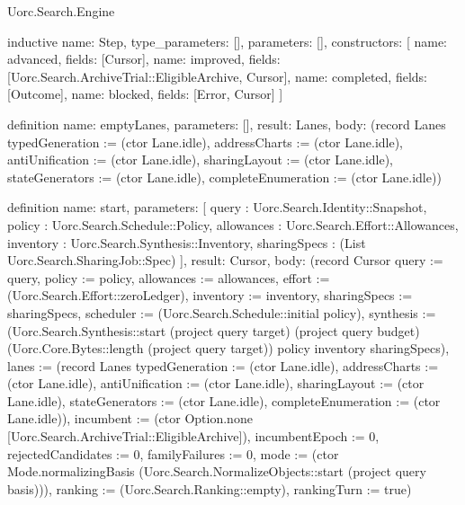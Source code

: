 \begin{lexlean}{Uorc.Search.Engine}
\begin{semanticmodule}
inductive{
  name: Step,
  type_parameters: [],
  parameters: [],
  constructors: [
    {name: advanced, fields: [Cursor]},
    {name: improved, fields: [Uorc.Search.ArchiveTrial::EligibleArchive, Cursor]},
    {name: completed, fields: [Outcome]},
    {name: blocked, fields: [Error, Cursor]}
  ]
}

definition{
  name: emptyLanes,
  parameters: [],
  result: Lanes,
  body: (record Lanes {typedGeneration := (ctor Lane.idle), addressCharts := (ctor Lane.idle), antiUnification := (ctor Lane.idle), sharingLayout := (ctor Lane.idle), stateGenerators := (ctor Lane.idle), completeEnumeration := (ctor Lane.idle)})
}

definition{
  name: start,
  parameters: [
    query : Uorc.Search.Identity::Snapshot,
    policy : Uorc.Search.Schedule::Policy,
    allowances : Uorc.Search.Effort::Allowances,
    inventory : Uorc.Search.Synthesis::Inventory,
    sharingSpecs : (List Uorc.Search.SharingJob::Spec)
  ],
  result: Cursor,
  body: (record Cursor {query := query, policy := policy, allowances := allowances, effort := (Uorc.Search.Effort::zeroLedger), inventory := inventory, sharingSpecs := sharingSpecs, scheduler := (Uorc.Search.Schedule::initial policy), synthesis := (Uorc.Search.Synthesis::start (project query target) (project query budget) (Uorc.Core.Bytes::length (project query target)) policy inventory sharingSpecs), lanes := (record Lanes {typedGeneration := (ctor Lane.idle), addressCharts := (ctor Lane.idle), antiUnification := (ctor Lane.idle), sharingLayout := (ctor Lane.idle), stateGenerators := (ctor Lane.idle), completeEnumeration := (ctor Lane.idle)}), incumbent := (ctor Option.none [Uorc.Search.ArchiveTrial::EligibleArchive]), incumbentEpoch := 0, rejectedCandidates := 0, familyFailures := 0, mode := (ctor Mode.normalizingBasis (Uorc.Search.NormalizeObjects::start (project query basis))), ranking := (Uorc.Search.Ranking::empty), rankingTurn := true})
}


\end{semanticmodule}
\end{lexlean}
